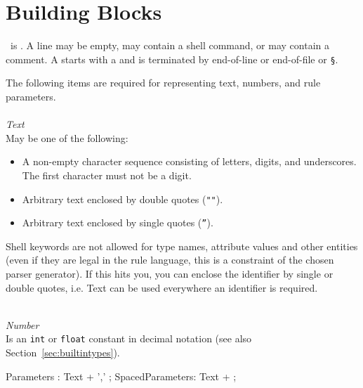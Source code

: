 \section{Building Blocks}\label{shellbuildingblocks}

\GrShell\ is .
A line may be empty, may contain a shell command, or may contain a comment.
A  starts with a \indexed{\texttt{\#}} and is terminated by end-of-line
 or end-of-file or \texttt{\S}.

The following items are required for representing text, numbers, and rule parameters.\\
\\
\emph{Text}\\
May be one of the following:
\begin{itemize}
  \item A non-empty character sequence consisting of letters, digits, and underscores. The first character must not be a digit.
  \item Arbitrary text enclosed by double quotes (\texttt{""}).
  \item Arbitrary text enclosed by single quotes (\texttt{''}).
\end{itemize}
Shell keywords are not allowed for type names, attribute values and other entities (even if they are legal in the rule language, this is a constraint of the chosen parser generator).
If this hits you, you can enclose the identifier by single or double quotes, i.e. Text can be used everywhere an identifier is required.

\mbox{ }\\
\emph{Number}\\
Is an \texttt{int} or \texttt{float} constant in decimal notation (see also Section~\ref{sec:builtintypes}).

\begin{rail}
 Parameters : Text + ',' ;
 SpacedParameters: Text + ;
\end{rail}

